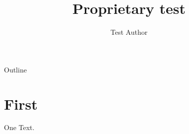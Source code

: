 \documentclass[aspectratio=169,10pt]{beamer}
\title{Proprietary test}
\author{Test Author}
\begin{document}
\maketitle
\begin{frame}[toc]{Outline}
	\tableofcontents
\end{frame}
\section{First}
\begin{frame}{One}
	Text.
\end{frame}
\end{document}
